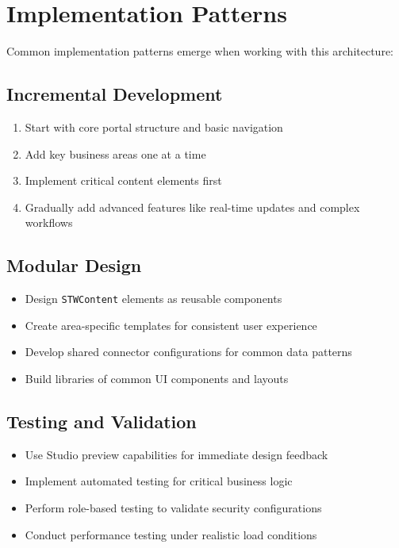 \section{Implementation Patterns}
\label{sec:implementation-patterns}

Common implementation patterns emerge when working with this architecture:

\subsection{Incremental Development}

\begin{enumerate}
	\item Start with core portal structure and basic navigation
	\item Add key business areas one at a time
	\item Implement critical content elements first
	\item Gradually add advanced features like real-time updates and complex workflows
\end{enumerate}

\subsection{Modular Design}

\begin{itemize}
	\item Design \texttt{STWContent} elements as reusable components
	\item Create area-specific templates for consistent user experience
	\item Develop shared connector configurations for common data patterns
	\item Build libraries of common UI components and layouts
\end{itemize}

\subsection{Testing and Validation}

\begin{itemize}
	\item Use Studio preview capabilities for immediate design feedback
	\item Implement automated testing for critical business logic
	\item Perform role-based testing to validate security configurations
	\item Conduct performance testing under realistic load conditions
\end{itemize}

